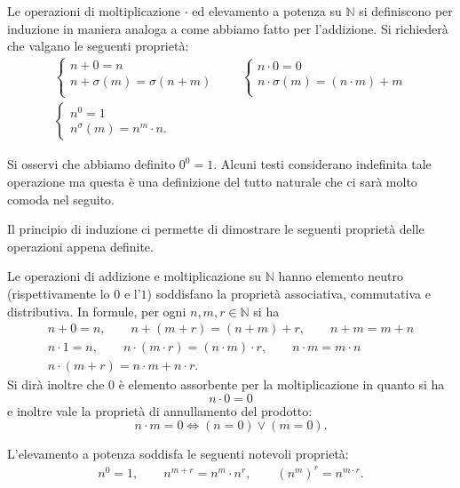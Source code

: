 \documentclass[italian,a4paper,twosides,headinclude]{scrbook}
\newcommand{\NN}{\mathbb N}
\begin{document}
Le operazioni di moltiplicazione $\cdot$ ed elevamento a potenza su $\NN$
si definiscono per induzione in maniera analoga a come abbiamo fatto per l'addizione.
Si richiederà che valgano le seguenti proprietà:
\begin{gather*}
   \begin{cases}
     n + 0 = n \\
     n + \sigma(m) = \sigma(n+m)\\
   \end{cases}
   \qquad
   \begin{cases}
     n \cdot 0 = 0\\
     n \cdot \sigma(m) = (n\cdot m) + m\\
   \end{cases}
   \\
   \begin{cases}
     n ^ 0 = 1\\
     n ^ \sigma(m) = n^m \cdot n.
   \end{cases}
\end{gather*}

Si osservi che abbiamo definito $0^0=1$.
Alcuni testi considerano indefinita tale operazione ma
questa è una definizione del tutto naturale che ci sarà molto comoda nel seguito.

Il principio di induzione ci permette di dimostrare le seguenti proprietà delle
operazioni appena definite.

\begin{theorem}
Le operazioni di addizione e moltiplicazione su $\NN$ hanno elemento neutro
(rispettivamente lo $0$ e l'$1$) soddisfano la proprietà associativa, commutativa
e distributiva. In formule, per ogni $n,m,r\in \NN$ si ha
\begin{gather*}
  n+0= n, \qquad n+(m+r) = (n+m)+r, \qquad n+m=m+n\\
  n\cdot 1 = n, \qquad n\cdot(m\cdot r) = (n\cdot m)\cdot r, \qquad n\cdot m=m\cdot n\\
  n\cdot(m+r) = n\cdot m + n \cdot r.
\end{gather*}
Si dirà inoltre che $0$ è elemento assorbente per la moltiplicazione in quanto si ha
\[
   n\cdot 0 = 0
\]
e inoltre vale la proprietà di annullamento del prodotto:
\[
  n\cdot m = 0 \iff (n=0)\lor(m=0).
\]

L'elevamento a potenza soddisfa le seguenti notevoli proprietà:
\begin{gather*}
n^0 = 1, \qquad
n^{m+r} = n^m \cdot n^r, \qquad
(n^m)^r = n^{m\cdot r}.
\end{gather*}
\end{theorem}
\end{document}
